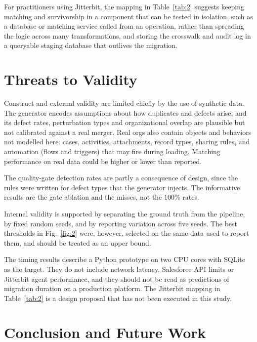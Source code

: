 For practitioners using Jitterbit, the mapping in Table~\ref{tab:2} suggests keeping matching and survivorship in a component that can be tested in isolation, such as a database or matching service called from an operation, rather than spreading the logic across many transformations, and storing the crosswalk and audit log in a queryable staging database that outlives the migration.

\section{Threats to Validity}\label{sec:7}

Construct and external validity are limited chiefly by the use of synthetic data. The generator encodes assumptions about how duplicates and defects arise, and its defect rates, perturbation types and organizational overlap are plausible but not calibrated against a real merger. Real orgs also contain objects and behaviors not modelled here: cases, activities, attachments, record types, sharing rules, and automation (flows and triggers) that may fire during loading. Matching performance on real data could be higher or lower than reported.

The quality-gate detection rates are partly a consequence of design, since the rules were written for defect types that the generator injects. The informative results are the gate ablation and the misses, not the 100\% rates.

Internal validity is supported by separating the ground truth from the pipeline, by fixed random seeds, and by reporting variation across five seeds. The best thresholds in Fig.~\ref{fig:2} were, however, selected on the same data used to report them, and should be treated as an upper bound.

The timing results describe a Python prototype on two CPU cores with SQLite as the target. They do not include network latency, Salesforce API limits or Jitterbit agent performance, and they should not be read as predictions of migration duration on a production platform. The Jitterbit mapping in Table~\ref{tab:2} is a design proposal that has not been executed in this study.

\section{Conclusion and Future Work}\label{sec:8}

